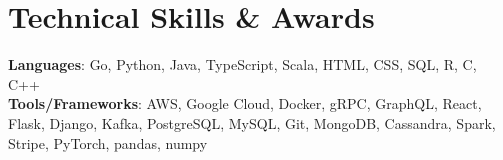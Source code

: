 \documentclass[letterpaper,11pt]{article}
\begin{document}
\section{Technical Skills \& Awards}
 \begin{itemize}[leftmargin=0.15in, label={}]
    \small{\item{
     \textbf{Languages}{: Go, Python, Java, TypeScript, Scala, HTML, CSS, SQL, R, C, C++} \\
     \textbf{Tools/Frameworks}{: AWS, Google Cloud, Docker, gRPC, GraphQL, React, Flask, Django, Kafka, PostgreSQL, MySQL, Git, MongoDB, Cassandra, Spark, Stripe, PyTorch, pandas, numpy} \\
    }}

 \end{itemize}



\end{document}
